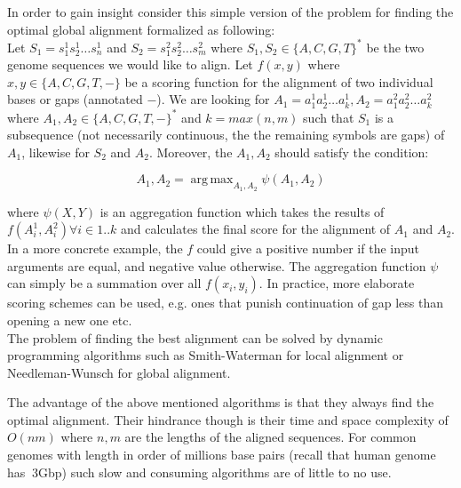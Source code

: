 In order to gain insight consider this simple version of the problem for finding the optimal global alignment formalized as following:\\
Let $S_1 = s_1^1s_2^1\dots s_n^1$ and $S_2 = s_1^2s_2^2 \dots s_m^2$ where $S_1, S_2 \in \{A,C,G,T\}^*$ be the two genome sequences we would like to align. Let $f(x,y)$ where $x,y \in \{A,C,G,T,-\}$ be a scoring function for the alignment of two individual bases or gaps (annotated $-$). We are looking for $A_1 = a_1^1a_2^1 \dots a_k^1, A_2  = a_1^2a_2^2 \dots a_k^2$ where $A_1, A_2\in \{A,C,G,T,-\}^*$ and $k = max(n,m)$ such that $S_1$ is a subsequence (not necessarily continuous, the the remaining symbols are gaps) of $A_1$, likewise for $S_2$ and $A_2$.
Moreover, the $A_1, A_2$ should satisfy the condition:

$$A_1, A_2 = \operatorname{arg\,max}_{A_1, A_2} \psi(A_1, A_2)$$

where $\psi(X,Y)$ is an aggregation function which takes the results of $f(A_i^1,A_i^2) \forall i \in {1..k}$ and calculates the final score for the alignment of $A_1$ and $A_2$.\\

In a more concrete example, the $f$ could give a positive number if the input arguments are equal, and negative value otherwise. The aggregation function $\psi$ can simply be a summation over all $f(x_i, y_i)$. In practice, more elaborate scoring schemes can be used, e.g. ones that punish continuation of gap less than opening a new one etc.\\ 

The problem of finding the best alignment can be solved by dynamic programming algorithms such as Smith-Waterman for local alignment or Needleman-Wunsch for global alignment.

The advantage of the above mentioned algorithms is that they always find the optimal alignment. Their hindrance though is their time and space complexity of $O(nm)$ where $n,m$ are the lengths of the aligned sequences. For common genomes with length in order of millions base pairs (recall that human genome has $~$3Gbp) such slow and consuming algorithms are of little to no use.\\


